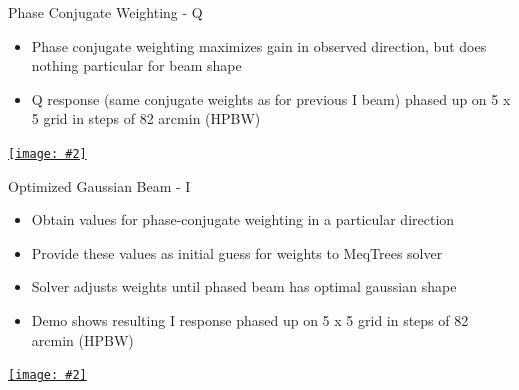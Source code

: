 \documentclass[pdf,azure,slideColor,colorBG]{prosper}
\newcommand{\moviewithpreview}[3]{%
    \pdfmark[{\texttt{[image: \#2]}}]{%
    pdfmark=/ANN,Subtype=/Movie,Movie=<< /F (#3) >>,%
    Activation=<< /ShowControls true /Mode /Repeat >>}}
\newcommand{\movie}[3]{%
    \pdfmark[{\hbox to #1 {\vbox to #2 { }}}]{%
    pdfmark=/ANN,Subtype=/Movie,Movie=<< /F (#3) /Poster true >>,%
    Activation=<< /ShowControls true /Mode /Repeat >>}}
\newcommand{\hrefWithPreview}[3]{%
  \href{#3}{\texttt{[image: \#2]}}
}
\begin{document}

\begin{slide}{Phase Conjugate Weighting - Q}
\begin{small}
\begin{itemize}
\item Phase conjugate weighting maximizes gain in observed
direction, but does nothing particular for beam shape
\item Q response (same conjugate weights as for previous I beam) phased up on 5 x 5 grid in steps of 82 arcmin (HPBW)
\end{itemize}
\end {small}
   \begin{center}
      \hrefWithPreview{4cm}{Q_1.ps}{run:movies/Q.gif}

   \end{center}
\end{slide}


\begin{slide} {Optimized Gaussian Beam - I}
\begin{small}
\begin{itemize}
\item Obtain values for phase-conjugate weighting in a particular direction
\item Provide these values as initial guess for weights to MeqTrees solver
\item Solver adjusts weights until phased beam has optimal gaussian shape
\item Demo shows resulting I response phased up on 5 x 5 grid in steps of 82 arcmin (HPBW)
\end{itemize}
\end {small}
   \begin{center}
      \hrefWithPreview{4cm}{I_gauss_2.ps}{run:movies/I_gauss.gif}

   \end{center}
\end{slide}
\end{document}
